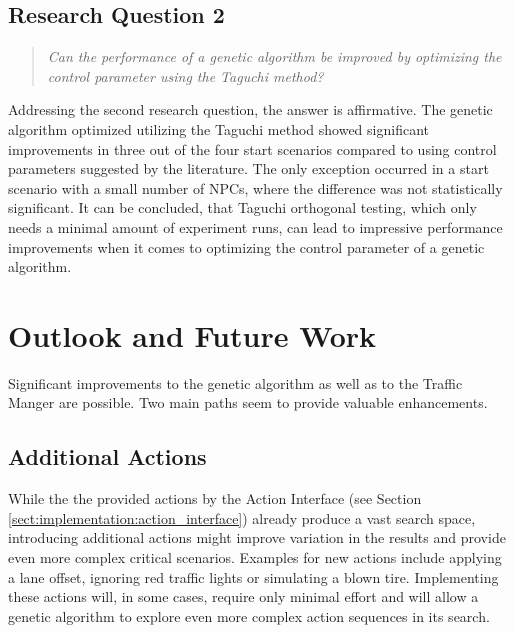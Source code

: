 \subsection{Research Question 2}
\begin{quote}
	\begin{em}
		\textit{Can the performance of a genetic algorithm be improved by optimizing the control parameter using the Taguchi method?}
	\end{em}
\end{quote}

Addressing the second research question, the answer is affirmative. The genetic algorithm optimized utilizing the Taguchi method showed significant improvements in three out of the four start scenarios compared to using control parameters suggested by the literature. The only exception occurred in a start scenario with a small number of NPCs, where the difference was not statistically significant. It can be concluded, that Taguchi orthogonal testing, which only needs a minimal amount of experiment runs, can lead to impressive performance improvements when it comes to optimizing the control parameter of a genetic algorithm.

\section{Outlook and Future Work}
Significant improvements to the genetic algorithm as well as to the Traffic Manger are possible. Two main paths seem to provide valuable enhancements.

\subsection{Additional Actions}
While the the provided actions by the Action Interface (see Section \ref{sect:implementation:action_interface}) already produce a vast search space, introducing additional actions might improve variation in the results and provide even more complex critical scenarios. Examples for new actions include applying a lane offset, ignoring red traffic lights or simulating a blown tire. Implementing these actions will, in some cases, require only minimal effort and will allow a genetic algorithm to explore even more complex action sequences in its search.

